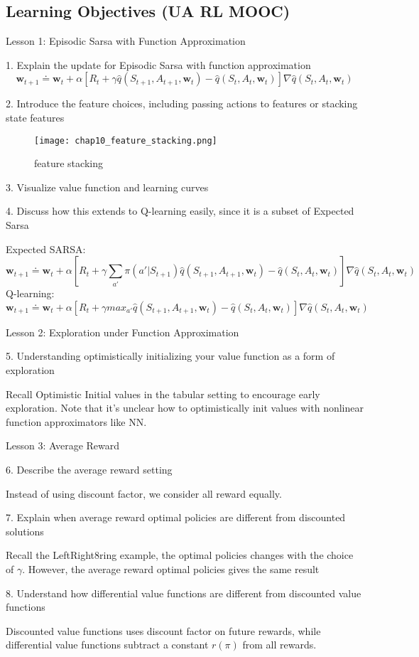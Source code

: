 \documentclass[sutton_barto_notes.tex]{subfiles}
\begin{document}
\subsection{Learning Objectives (UA RL MOOC)}
Lesson 1: Episodic Sarsa with Function Approximation 

1. Explain the update for Episodic Sarsa with function approximation 
$$\bm{w}_{t+1} \doteq \bm{w}_t + \alpha[R_{t} + \gamma\hat{q}(S_{t+1}, A_{t+1}, \bm{w}_t) - \hat{q}(S_t, A_t, \bm{w}_t)]\nabla\hat{q}(S_t, A_t, \bm{w}_t)$$

2. Introduce the feature choices, including passing actions to features or stacking state features 

\begin{figure}[h!]
  \texttt{[image: chap10\_feature\_stacking.png]}
  \caption{feature stacking}
  \label{fig:feature-stacking}
\end{figure}

3. Visualize value function and learning curves 

4. Discuss how this extends to Q-learning easily, since it is a subset of Expected Sarsa 

Expected SARSA:
$$\bm{w}_{t+1} \doteq \bm{w}_t + \alpha[R_{t} + \gamma\sum_{a'}\pi(a'|S_{t+1})\hat{q}(S_{t+1}, A_{t+1}, \bm{w}_t) - \hat{q}(S_t, A_t, \bm{w}_t)]\nabla\hat{q}(S_t, A_t, \bm{w}_t)$$
Q-learning:
$$\bm{w}_{t+1} \doteq \bm{w}_t + \alpha[R_{t} + \gamma max_{a'}\hat{q}(S_{t+1}, A_{t+1}, \bm{w}_t) - \hat{q}(S_t, A_t, \bm{w}_t)]\nabla\hat{q}(S_t, A_t, \bm{w}_t)$$

Lesson 2: Exploration under Function Approximation 

5. Understanding optimistically initializing your value function as a form of exploration

Recall Optimistic Initial values in the tabular setting to encourage early exploration. Note that it's unclear how to optimistically init values with nonlinear function approximators like NN.

Lesson 3: Average Reward 

6. Describe the average reward setting 

Instead of using discount factor, we consider all reward equally.

7. Explain when average reward optimal policies are different from discounted solutions 

Recall the LeftRight8ring example, the optimal policies changes with the choice of $\gamma$. However, the average reward optimal policies gives the same result

8. Understand how differential value functions are different from discounted value functions

Discounted value functions uses discount factor on future rewards, while differential value functions subtract a constant $r(\pi)$ from all rewards.
\end{document}
